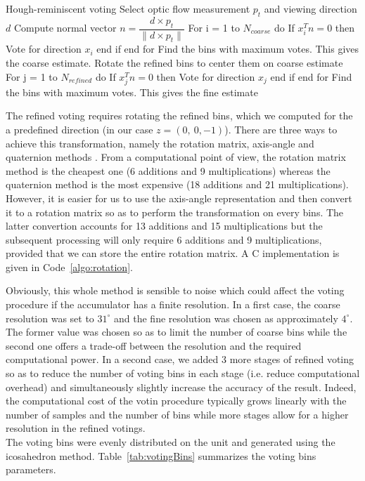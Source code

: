 \begin{algorithm}[colback=white, label=algo:houghVoting]{Hough-reminiscent voting}
Select optic flow measurement $p_t$ and viewing direction $d$
Compute normal vector $n = \dfrac{d \times p_t}{\|d \times p_t\|}$
For i = 1 to $N_{coarse}$ do
   If $x_i^Tn = 0$ then
      Vote for direction $x_i$
   end if
end for
Find the bins with maximum votes. This gives the coarse estimate.
Rotate the refined bins to center them on coarse estimate
For j = 1 to $N_{refined}$ do
   If $x_j^Tn = 0$ then
      Vote for direction $x_j$
   end if
end for
Find the bins with maximum votes. This gives the fine estimate
\end{algorithm}

The refined voting requires rotating the refined bins, which we computed for the a predefined direction (in our case $z = (0,~ 0,-1)$). There are three ways to achieve this transformation, namely the rotation matrix, axis-angle and quaternion methods \cite{rotation}. From a computational point of view, the rotation matrix method is the cheapest one (6 additions and 9 multiplications) whereas the quaternion method is the most expensive (18 additions and 21 multiplications). However, it is easier for us to use the axis-angle representation and then convert it to a rotation matrix so as to perform the transformation on every bins. The latter convertion accounts for 13 additions and 15 multiplications but the subsequent processing will only require 6 additions and 9 multiplications, provided that we can store the entire rotation matrix. A C implementation is given in Code~\ref{algo:rotation}.

Obviously, this whole method is sensible to noise which could affect the voting procedure if the accumulator has a finite resolution. In a first case, the coarse resolution was set to $31^\circ$ and the fine resolution was chosen as approximately $4^\circ$. The former value was chosen so as to limit the number of coarse bins while the second one offers a trade-off between the resolution and the required computational power. In a second case, we added 3 more stages of refined voting so as to reduce the number of voting bins in each stage (i.e. reduce computational overhead) and simultaneously slightly increase the accuracy of the result. Indeed, the computational cost of the votin procedure typically grows linearly with the number of samples and the number of bins while more stages allow for a higher resolution in the refined votings.\\
The voting bins were evenly distributed on the unit and generated using the icosahedron method. Table~\ref{tab:votingBins} summarizes the voting bins parameters.


